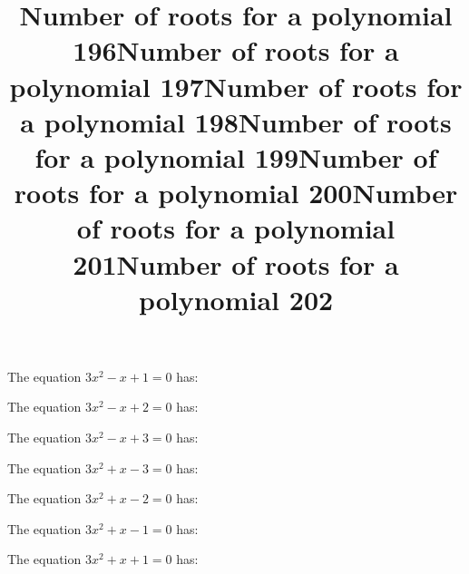 \documentclass{article}
\begin{document}
\begin{category}
\begin{question}[multichoice]
\end{question}
\begin{question}[multichoice]
\title{Number of roots for a polynomial 196}
The equation $3 x^{2} - x + 1=0$ has:



\end{question}
\begin{question}[multichoice]
\title{Number of roots for a polynomial 197}
The equation $3 x^{2} - x + 2=0$ has:



\end{question}
\begin{question}[multichoice]
\title{Number of roots for a polynomial 198}
The equation $3 x^{2} - x + 3=0$ has:



\end{question}
\begin{question}[multichoice]
\title{Number of roots for a polynomial 199}
The equation $3 x^{2} + x - 3=0$ has:



\end{question}
\begin{question}[multichoice]
\title{Number of roots for a polynomial 200}
The equation $3 x^{2} + x - 2=0$ has:



\end{question}
\begin{question}[multichoice]
\title{Number of roots for a polynomial 201}
The equation $3 x^{2} + x - 1=0$ has:



\end{question}
\begin{question}[multichoice]
\title{Number of roots for a polynomial 202}
The equation $3 x^{2} + x + 1=0$ has:


\end{question}
\end{category}
\end{document}
